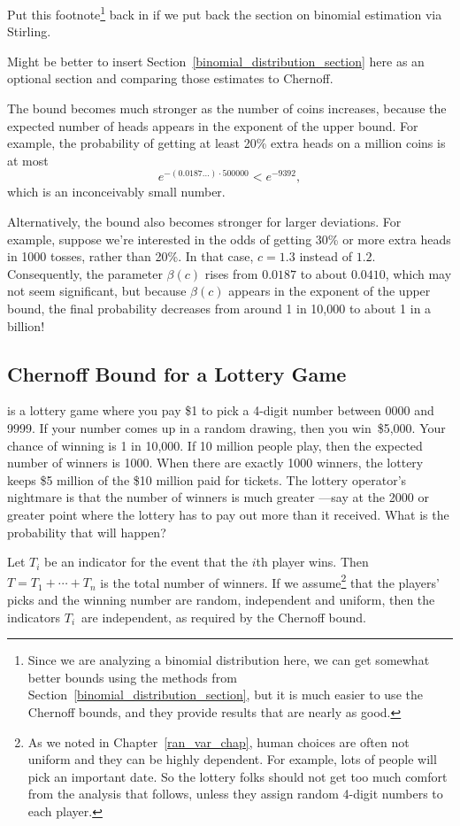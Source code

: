 \begin{editingnotes}
Put this footnote\footnote{Since we are analyzing a binomial
  distribution here, we can get somewhat better bounds using the
  methods from Section~\ref{binomial_distribution_section}, but it is
  much easier to use the Chernoff bounds, and they provide results
  that are nearly as good.} back in if we put back the section on binomial estimation
via Stirling.

Might be better to insert Section~\ref{binomial_distribution_section}
here as an optional section and comparing those estimates to
Chernoff.
\end{editingnotes}

The bound becomes much stronger as the number of coins increases,
because the expected number of heads appears in the exponent of the
upper bound.  For example, the probability of getting at least 20\%
extra heads on a million coins is at most
\[
e^{- (0.0187\dots) \cdot 500000} < e^{-9392},
\]
which is an inconceivably small number.  %

Alternatively, the bound also becomes stronger for larger deviations.
For example, suppose we're interested in the odds of getting 30\% or
more extra heads in 1000 tosses, rather than 20\%.  In that case,
$c= 1.3$ instead of $1.2$.  Consequently, the parameter $\beta(c)$ rises from
$0.0187$ to about $0.0410$, which may not seem significant, but because
$\beta(c)$ appears in the exponent of the upper bound, the final probability
decreases from around 1 in 10,000 to about 1 in a billion!

\subsection{Chernoff Bound for a Lottery Game}

 is a lottery game where you pay \$1 to pick a 4-digit
number between 0000 and 9999.  If your number comes up in a random
drawing, then you win~\$5,000.  Your chance of winning is 1 in 10,000.
If 10 million people play, then the expected number of winners is
1000.  When there are exactly 1000 winners, the lottery keeps \$5
million of the \$10 million paid for tickets.  The lottery operator's
nightmare is that the number of winners is much greater ---say at the
2000 or greater point where the lottery has to pay out more than it
received.  What is the probability that will happen?

Let $T_i$ be an indicator for the event that the $i$th player wins.
Then $T = T_1 + \cdots + T_n$ is the total number of winners.  If we
assume\footnote{As we noted in Chapter~\ref{ran_var_chap}, human
  choices are often not uniform and they can be highly dependent.  For
  example, lots of people will pick an important date.  So the lottery
  folks should not get too much comfort from the analysis that
  follows, unless they assign random 4-digit numbers to each player.}
that the players' picks and the winning number are random, independent
and uniform, then the indicators $T_i$~are independent, as required by
the Chernoff bound.

